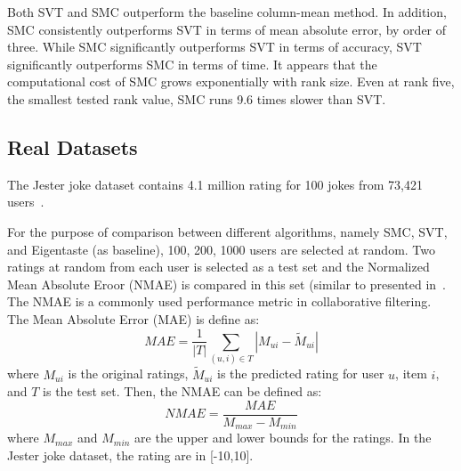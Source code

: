 \documentclass{article} %
\begin{document}
Both SVT and SMC outperform the baseline column-mean method. In addition, SMC consistently outperforms SVT in terms of mean absolute error, by order of three. While SMC significantly outperforms SVT in terms of accuracy, SVT significantly outperforms SMC in terms of time.  It appears that the computational cost of SMC grows exponentially with rank size. Even at rank five, the smallest tested rank value, SMC runs 9.6 times slower than SVT. 


\subsection{Real Datasets}
The Jester joke dataset contains 4.1 million rating for 100 jokes from 73,421 users~\cite{r30}. 

For the purpose of comparison between different algorithms, namely SMC, SVT, and Eigentaste (as baseline), {100, 200, 1000} users are selected at random.  Two ratings at random from each user is selected as a test set and the Normalized Mean Absolute Eroor (NMAE) is compared in this set (similar to presented in~\cite{oh2010thesis}. The NMAE is a commonly used performance metric in collaborative filtering. The Mean Absolute Error (MAE) is define as:
\begin{equation}
MAE = \frac{1}{|T|}\sum\limits_{(u,i) \in T} |M_{ui} - \widetilde{M}_{ui}|
\end{equation}
where $M_{ui}$ is the original ratings, $\widetilde{M}_{ui}$ is the predicted rating for user $u$, item $i$, and $T$ is the test set. Then, the NMAE can be defined as:
\begin{equation}
NMAE = \frac{MAE}{M_{max}-M_{min}}
\end{equation}
where $M_{max}$ and $M_{min}$ are the upper and lower bounds for the ratings. In the Jester joke dataset, the rating are in [-10,10].
\end{document}
